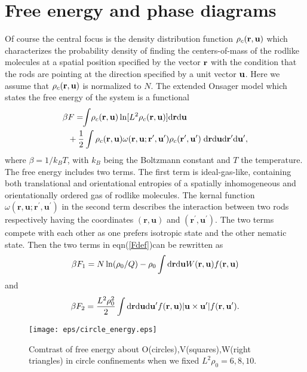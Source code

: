 \documentclass[prl,twocolumn,preprintnumbers,reprint]{revtex4}
\newcommand{\dd}{\mathrm{d}}
\newcommand{\intn}{\!\!\int\!}
\newcommand{\bu}{{\bf u}}
\newcommand{\br}{{\bf r}}
\newcommand{\rd}{{\rm d}}
\begin{document}
\section{Free energy and phase diagrams}
Of course the central focus is the density distribution function $\rho_c(\br,\bu)$ which characterizes the probability density of finding the centers-of-mass of the rodlike molecules at a spatial position specified by the vector $\br$ with the condition that the rods are pointing at the direction specified by a unit vector $\bu$. Here we assume that $\rho_c(\br,\bu)$ is normalized to $N$. The extended Onsager model which states the free energy of the system is a functional
\begin{equation}
\begin{aligned}
\label{Fdef}
 \beta &F=\intn\rho_c(\mathbf{r},\mathbf{u}) \ln [L^2\rho_c(\mathbf{r},\mathbf{u}) ] {\rm d}\mathbf{r} {\rm d}\mathbf{u}\\
&+ \frac{1}{2}\int\rho_c(\mathbf{r},\mathbf{u}) \omega(\mathbf{r},\mathbf{u};\mathbf{r}^\prime, \mathbf{u}^\prime)\rho_c(\mathbf{r}^\prime, \mathbf{u}^\prime) \;\dd\mathbf{r} \dd\mathbf{u} \dd\mathbf{r}^\prime \dd\mathbf{u}^\prime,
\end{aligned}
\end{equation}
where $\beta = 1/k_B T$, with $k_B$ being the Boltzmann constant and $T$ the temperature.  The free energy includes two terms. The first term is ideal-gas-like, containing both translational and orientational entropies of a spatially inhomogeneous and orientationally ordered gas of rodlike molecules. The kernal function $\omega(\mathbf{r},\mathbf{u};\mathbf{r}^\prime, \mathbf{u}^\prime)$ in the second term describes the interaction between two rods respectively having the coordinates $(\mathbf{r},\mathbf{u})$ and $(\mathbf{r}^\prime, \mathbf{u}^\prime)$. The two terms compete with each other as one prefers isotropic state and the other nematic state. Then the two terms in eqn(\ref{Fdef})can be rewritten as
\begin{equation}
\beta F_1=N\ln(\rho_0/Q)-\rho_0\int\rd\br\rd\bu W(\br,\bu)f(\br,\bu)
\end{equation}
and
\begin{equation}
\beta F_2=\frac{L^2\rho_0^2}{2}\int\rd\br\rd\bu\rd\bu'f(\br,\bu)|\bu\times\bu'|f(\br,\bu').
\end{equation}

\begin{figure*}[!t]\centering
\texttt{[image: eps/circle\_energy.eps]}
\caption{Comtrast of free energy about O(circles),V(squares),W(right triangles) in circle confinements when we fixed $L^2\rho_0=6,8,10$. } \label{P2}
\end{figure*}
\end{document}

